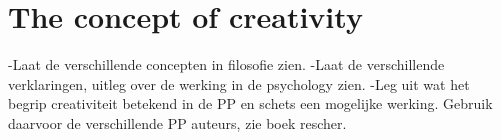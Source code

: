 \documentclass[a4paper]{Thesis}
\begin{document}

%














%

\chapter{The concept of creativity}

-Laat de verschillende concepten in filosofie zien.
-Laat de verschillende verklaringen, uitleg over de werking in de psychology zien.
-Leg uit wat het begrip creativiteit betekend in de PP en schets een mogelijke werking. Gebruik daarvoor de verschillende PP auteurs, zie boek rescher.
\end{document}

